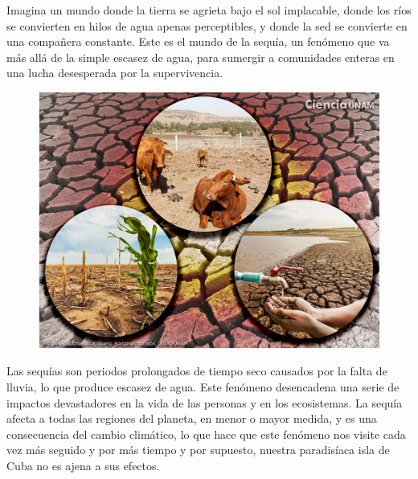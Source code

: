 \documentclass[12pt]{article}
\begin{document}
	
	Imagina un mundo donde la tierra se agrieta bajo el sol implacable, donde los ríos se convierten en hilos de agua apenas perceptibles, y donde la sed se convierte en una compañera constante. Este es el mundo de la sequía, un fenómeno que va más allá de la simple escasez de agua, para sumergir a comunidades enteras en una lucha desesperada por la supervivencia.
    \par\vspace{4mm}
	\begin{figure}[H]
		\centering
		\includegraphics[width=0.7\linewidth]{./Report/images/4.png}
		\label{fig:ian}
	\end{figure}
	\par\vspace{4mm}
	Las sequías son periodos prolongados de tiempo seco causados por la falta de lluvia, lo que produce escasez de agua. Este fenómeno desencadena una serie de impactos devastadores en la vida de las personas y en los ecosistemas. La sequía afecta a todas las regiones del planeta, en menor o mayor medida, y es una consecuencia del cambio climático, lo que hace que este fenómeno nos visite cada vez más seguido y por más tiempo y por supuesto, nuestra paradisíaca isla de Cuba no es ajena a sus efectos.
	
\end{document}
